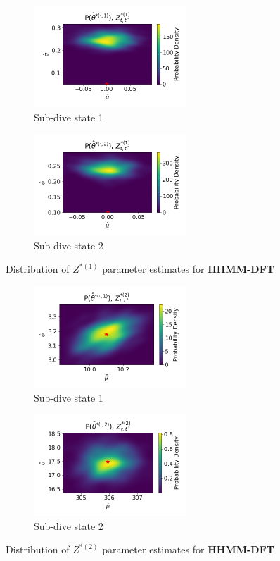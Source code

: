 \documentclass[12pt]{TD-CJS}
\begin{document}
\begin{figure}[ht]
	\centering
	\begin{subfigure}[t]{0.45\textwidth}
        \centering
        \includegraphics[width=2.25in]{../Plots/hhmm_FV_uncorr_MLE_density_A_0_0.png}
        \caption{Sub-dive state 1}
    \end{subfigure}
    \begin{subfigure}[t]{0.45\textwidth}
        \centering
        \includegraphics[width=2.25in]{../Plots/hhmm_FV_uncorr_MLE_density_A_0_1.png}
        \caption{Sub-dive state 2}
    \end{subfigure}
    \caption{Distribution of $Z^{*(1)}$ parameter estimates for \textbf{HHMM-DFT}}
\end{figure}

\begin{figure}[ht]
	\centering
	\begin{subfigure}[t]{0.45\textwidth}
        \centering
        \includegraphics[width=2.25in]{../Plots/hhmm_FV_uncorr_MLE_density_FoVeDBA_0_0.png}
        \caption{Sub-dive state 1}
    \end{subfigure}
    \begin{subfigure}[t]{0.45\textwidth}
        \centering
        \includegraphics[width=2.25in]{../Plots/hhmm_FV_uncorr_MLE_density_FoVeDBA_0_1.png}
        \caption{Sub-dive state 2}
    \end{subfigure}
    \caption{Distribution of $Z^{*(2)}$ parameter estimates for \textbf{HHMM-DFT}}
\end{figure}
\end{document}
